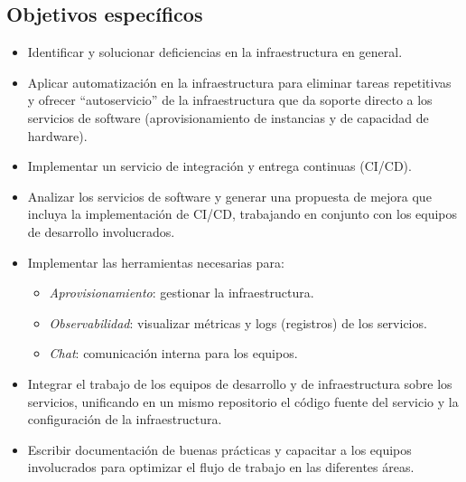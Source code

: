 \subsection{Objetivos específicos}

\begin{itemize}
\item Identificar y solucionar deficiencias en la infraestructura en
  general.
\item Aplicar automatización en la infraestructura para eliminar
  tareas repetitivas y ofrecer “autoservicio” de la infraestructura
  que da soporte directo a los servicios de software
  (aprovisionamiento de instancias y de capacidad de hardware).
\item Implementar un servicio de integración y entrega continuas
  (CI/CD).
\item Analizar los servicios de software y generar una propuesta de
  mejora que incluya la implementación de CI/CD, trabajando en
  conjunto con los equipos de desarrollo involucrados.
\item Implementar las herramientas necesarias para:
\begin{itemize}
\item \textit{Aprovisionamiento}: gestionar la infraestructura.
\item \textit{Observabilidad}: visualizar métricas y logs (registros)
  de los servicios.
\item \textit{Chat}: comunicación interna para los equipos.
\end{itemize}
\item Integrar el trabajo de los equipos de desarrollo y de
  infraestructura sobre los servicios, unificando en un mismo
  repositorio el código fuente del servicio y la configuración de la
  infraestructura.
\item Escribir documentación de buenas prácticas y capacitar a los
  equipos involucrados para optimizar el flujo de trabajo en las
  diferentes áreas.
\end{itemize}

